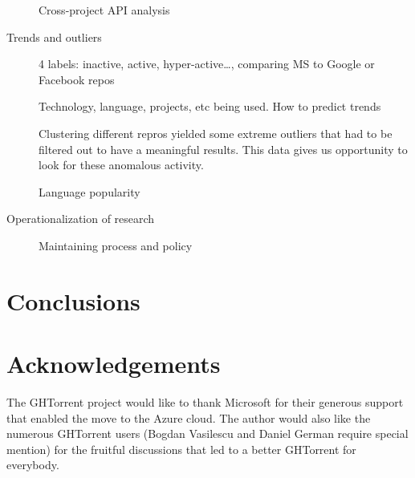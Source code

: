 \documentclass{sig-alternate}
\begin{document}
\begin{description}
Cross-project API analysis



  \item[Trends and outliers]
4 labels: inactive, active, hyper-active…, comparing MS to Google or Facebook repos


Technology, language, projects, etc being used.  How to predict trends

Clustering different repros yielded some extreme outliers that had to be filtered out to have a meaningful results.  This data gives us opportunity to look for these anomalous activity.

Language popularity

  \item[Operationalization of research] Maintaining process and policy

\end{description}

\section{Conclusions}



\section*{Acknowledgements}

The GHTorrent project would like to thank Microsoft for their generous support
that enabled the move to the Azure cloud. The author would also like the
numerous GHTorrent users (Bogdan Vasilescu and Daniel German require special
mention) for the fruitful discussions that led to a better GHTorrent for
everybody.



\end{document}
